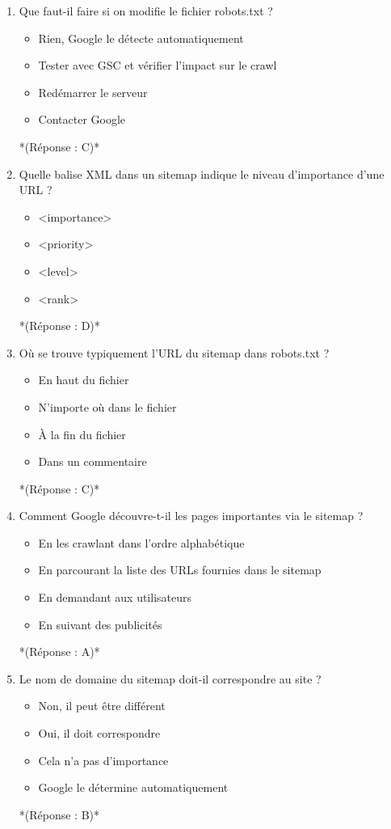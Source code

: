 \documentclass[12pt,a4paper,twoside]{report}
\begin{document}
\begin{enumerate}
\item Que faut-il faire si on modifie le fichier robots.txt ?
\begin{itemize}
\item[A)] Rien, Google le détecte automatiquement
\item[B)] Tester avec GSC et vérifier l'impact sur le crawl
\item[C)] Redémarrer le serveur
\item[D)] Contacter Google
\end{itemize}
*(Réponse : C)*

\item Quelle balise XML dans un sitemap indique le niveau d'importance d'une URL ?
\begin{itemize}
\item[A)] <importance>
\item[B)] <priority>
\item[C)] <level>
\item[D)] <rank>
\end{itemize}
*(Réponse : D)*

\item Où se trouve typiquement l'URL du sitemap dans robots.txt ?
\begin{itemize}
\item[A)] En haut du fichier
\item[B)] N'importe où dans le fichier
\item[C)] À la fin du fichier
\item[D)] Dans un commentaire
\end{itemize}
*(Réponse : C)*

\item Comment Google découvre-t-il les pages importantes via le sitemap ?
\begin{itemize}
\item[A)] En les crawlant dans l'ordre alphabétique
\item[B)] En parcourant la liste des URLs fournies dans le sitemap
\item[C)] En demandant aux utilisateurs
\item[D)] En suivant des publicités
\end{itemize}
*(Réponse : A)*

\item Le nom de domaine du sitemap doit-il correspondre au site ?
\begin{itemize}
\item[A)] Non, il peut être différent
\item[B)] Oui, il doit correspondre
\item[C)] Cela n'a pas d'importance
\item[D)] Google le détermine automatiquement
\end{itemize}
*(Réponse : B)*


\end{enumerate}
\end{document}
